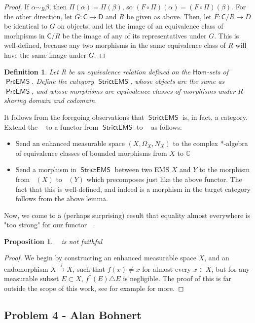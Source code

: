 \documentclass{article}
\newcommand{\C}{\mathbb{C}}
\newtheorem{proposition}[subsection]{Proposition}
\newtheorem{definition}[subsection]{Definition}
\DeclareMathOperator{\calg}{\textsf{CAlg}^{*}_{\mathbb{C}}}
\DeclareMathOperator{\linf}{L^\infty}
\DeclareMathOperator{\preems}{\textsf{PreEMS}}
\DeclareMathOperator{\strictems}{\textsf{StrictEMS}}
\begin{document}
\begin{proof}
	If $\alpha\sim_R\beta$, then $\Pi(\alpha)=\Pi(\beta)$, so $(F\circ\Pi)(\alpha) = (F\circ\Pi)(\beta)$.  For the other direction, let $G:\textsf{C}\rightarrow{\textsf{D}}$ and $R$ be given as above.  Then, let $F: \textsf{C}/R\rightarrow{D}$ be identical to $G$ on objects, and let the image of an equivalence class of morhpisms in $\textsf{C}/R$ be the image of any of its representatives under $G$.  This is well-defined, because any two morphisms in the same equivalence class of $R$ will have the same image under $G$.
\end{proof}
\begin{definition}
	Let R be an equivalence relation defined on the $\textsf{Hom}$-sets of $\preems$.  Define the category $\strictems$, whose objects are the same as $\preems$, and whose morphisms are equivalence classes of morphisms under $R$ sharing domain and codomain.
\end{definition}
It follows from the foregoing observations that $\strictems$ is, in fact, a category.  Extend the $\linf$ to a functor from $\strictems$ to $\calg$ as follows:
\begin{itemize}
	\item Send an enhanced measurable space $(X,\Omega_X,N_X)$ to the complex *-algebra of equivalence classes of bounded morphisms from $X$ to $\C$
	\item Send a morphism in $\strictems$ between two EMS $X$ and $Y$ to the morphism from $\linf(X)$ to $\linf(Y)$ which precomposes just like the above functor.  The fact that this is well-defined, and indeed is a morphism in the target category follows from the above lemma.
\end{itemize}
Now, we come to a (perhaps surprising) result that equality almost everywhere is "too strong" for our functor $\linf$.
\begin{proposition}
	$\linf$ is not faithful
\end{proposition}
\begin{proof}
	We begin by constructing an enhanced measurable space $X$, and an endomorphism $X\xrightarrow{f}X$, such that $f(x)\neq x$ for almost every $x\in X$, but for any measurable subset $E\subset X$, $f^*(E)\triangle E$ is negligible.  The proof of this is far outside the scope of this work, see for example \cite{fremlin_2011} for more.
\end{proof}

\subsection{Problem 4 - Alan Bohnert}
\end{document}

